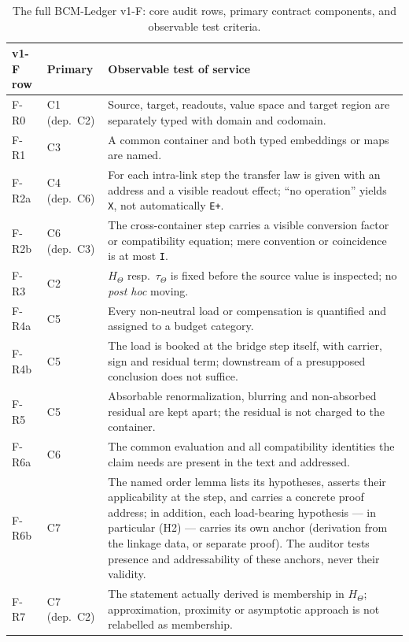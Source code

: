 \documentclass[11pt,a4paper]{article}
\begin{document}
\begin{table}[htbp]
\centering
\footnotesize
\caption{The full BCM-Ledger v1-F: core audit rows, primary contract components, and observable test criteria.}
\label{tab:bcm_ledger_v1f}
\begin{tabularx}{\textwidth}{@{}l l X@{}}
\toprule
v1-F row & Primary & Observable test of service \\
\midrule
F-R0 & C1 (dep.\ C2)
  & Source, target, readouts, value space and target region are separately
    typed with domain and codomain. \\
F-R1 & C3
  & A common container and both typed embeddings or maps are named. \\
F-R2a & C4 (dep.\ C6)
  & For each intra-link step the transfer law is given with an address and a
    visible readout effect; ``no operation'' yields \texttt{X}, not
    automatically \texttt{E+}. \\
F-R2b & C6 (dep.\ C3)
  & The cross-container step carries a visible conversion factor or
    compatibility equation; mere convention or coincidence is at most
    \texttt{I}. \\
F-R3 & C2
  & $H_\Theta$ resp.\ $\tau_\Theta$ is fixed before the source value is
    inspected; no \textit{post hoc} moving. \\
F-R4a & C5
  & Every non-neutral load or compensation is quantified and assigned to a
    budget category. \\
F-R4b & C5
  & The load is booked at the bridge step itself, with carrier, sign and
    residual term; downstream of a presupposed conclusion does not suffice. \\
F-R5 & C5
  & Absorbable renormalization, blurring and non-absorbed residual are kept
    apart; the residual is not charged to the container. \\
F-R6a & C6
  & The common evaluation and all compatibility identities the claim needs are
    present in the text and addressed. \\
F-R6b & C7
  & The named order lemma lists its hypotheses, asserts their applicability
    at the step, and carries a concrete proof address; in addition, each
    load-bearing hypothesis --- in particular (H2) --- carries its own
    anchor (derivation from the linkage data, or separate proof). The
    auditor tests presence and addressability of these anchors, never their
    validity. \\
F-R7 & C7 (dep.\ C2)
  & The statement actually derived is membership in $H_\Theta$; approximation,
    proximity or asymptotic approach is not relabelled as membership. \\

\end{tabularx}
\end{table}
\end{document}
